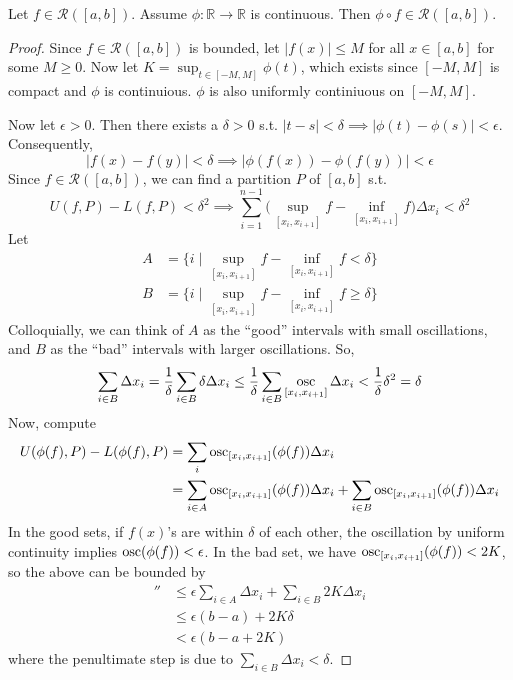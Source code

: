   \begin{theorem}
    Let $f \in \mathcal{R}([a, b])$. Assume $\phi: \mathbb{R} \to \mathbb{R}$ is continuous. Then $\phi \circ f \in \mathcal{R}([a, b])$. 
  \end{theorem}
  \begin{proof}
    Since $f \in \mathcal{R}([a, b])$ is bounded, let $|f(x)| \leq M$ for all $x \in [a, b]$ for some $M \geq 0$. Now let $K = \sup_{t \in [-M, M]} \phi(t)$, which exists since $[-M, M]$ is compact and $\phi$ is continuious. $\phi$ is also uniformly continiuous on $[-M, M]$. 

    Now let $\epsilon > 0$. Then there exists a $\delta > 0$ s.t. $|t - s| < \delta \implies |\phi(t) - \phi(s)| < \epsilon$. Consequently, 
    \begin{equation}
      |f(x) - f(y)| < \delta \implies |\phi(f(x)) - \phi(f(y))| < \epsilon
    \end{equation} 
    Since $f \in \mathcal{R}([a, b])$, we can find a partition $P$ of $[a, b]$ s.t. 
    \begin{equation}
      U(f, P) - L(f, P) < \delta^2 \implies \sum_{i=1}^{n-1} \big( \sup_{[x_i, x_{i+1}]} f - \inf_{[x_i, x_{i+1}]} f \big) \Delta x_i < \delta^2
    \end{equation} 
    Let 
    \begin{align}
      A & = \{ i \mid \sup_{[x_i, x_{i+1}]} f - \inf_{[x_i, x_{i+1}]} f < \delta \} \\ 
      B & = \{ i \mid \sup_{[x_i, x_{i+1}]} f - \inf_{[x_i, x_{i+1}]} f \geq \delta \} 
    \end{align} 
    Colloquially, we can think of $A$ as the ``good'' intervals with small oscillations, and $B$ as the ``bad'' intervals with larger oscillations. So, 
    \begin{equation}
      \sum_{i \in B} \Delta x_i = \frac{1}{\delta} \sum_{i \in B} \delta \Delta x_i \leq \frac{1}{\delta} \sum_{i \in B} \mathop{\osc}_{[x_i, x_{i+1}]} \Delta x_i < \frac{1}{\delta} \delta^2 = \delta
    \end{equation}
    Now, compute 
    \begin{align}
      U(\phi(f), P) - L(\phi(f), P) & = \sum_i \osc_{[x_i, x_{i+1}]} (\phi(f)) \Delta x_i  \\ 
                                    & = \sum_{i \in A} \osc_{[x_i, x_{i+1}]} (\phi(f)) \Delta x_i + \sum_{i \in B} \osc_{[x_i, x_{i+1}]} (\phi(f)) \Delta x_i 
    \end{align}
    In the good sets, if $f(x)$'s are within $\delta$ of each other, the oscillation by uniform continuity implies $\osc(\phi(f)) < \epsilon$. In the bad set, we have $\osc_{[x_i, x_{i+1}]} (\phi(f)) < 2K$, so the above can be bounded by 
    \begin{align}
      '' & \leq \epsilon \sum_{i \in A} \Delta x_i + \sum_{i \in B} 2K \Delta x_i \\
         & \leq \epsilon (b - a) + 2K \delta \\
         & < \epsilon (b - a + 2K)
    \end{align}
    where the penultimate step is due to $\sum_{i \in B} \Delta x_i < \delta$. 
  \end{proof}

